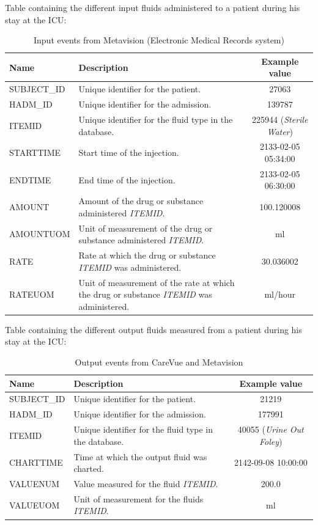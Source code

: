 Table containing the different input fluids administered to a patient during his stay at the ICU:

\begin{table}[H]
 \begin{center}
  \caption{Input events from Metavision (Electronic Medical Records system)}
  \begin{tabular}{| l | p{7cm} | c | }
   \hline
   \textbf{Name} & \textbf{Description} & \textbf{Example value} \\ \hline
   SUBJECT\_ID &  Unique identifier for the patient. & 27063 \\ \hline
   HADM\_ID & Unique identifier for the admission. & 139787 \\ \hline
   ITEMID & Unique identifier for the fluid type in the database. & 225944 (\textit{Sterile Water}) \\ \hline
   STARTTIME & Start time of the injection. & 2133-02-05 05:34:00 \\ \hline
   ENDTIME & End time of the injection. & 2133-02-05 06:30:00 \\ \hline
   AMOUNT & Amount of the drug or substance administered \textit{ITEMID}. & 100.120008 \\ \hline
   AMOUNTUOM & Unit of measurement of the drug or substance administered \textit{ITEMID}. & ml \\ \hline
   RATE & Rate at which the drug or substance \textit{ITEMID} was administered. & 30.036002 \\ \hline
   RATEUOM & Unit of measurement of the rate at which the drug or substance \textit{ITEMID} was administered. & ml/hour \\
   \hline
  \end{tabular}
 \end{center}
\end{table}

Table containing the different output fluids measured from a patient during his stay at the ICU:

\begin{table}[H]
 \begin{center}
  \caption{Output events from CareVue and Metavision}
  \begin{tabular}{| l | p{5cm} | c | }
   \hline
   \textbf{Name} & \textbf{Description} & \textbf{Example value} \\ \hline
   SUBJECT\_ID &  Unique identifier for the patient. & 21219 \\ \hline
   HADM\_ID & Unique identifier for the admission. & 177991 \\ \hline
   ITEMID & Unique identifier for the fluid type in the database. & 40055 (\textit{Urine Out Foley}) \\ \hline
   CHARTTIME & Time at which the output fluid was charted. & 2142-09-08 10:00:00 \\ \hline
   VALUENUM & Value measured for the fluid \textit{ITEMID}. & 200.0 \\ \hline
   VALUEUOM & Unit of measurement for the fluids \textit{ITEMID}. & ml \\
   \hline
  \end{tabular}
 \end{center}
\end{table}

